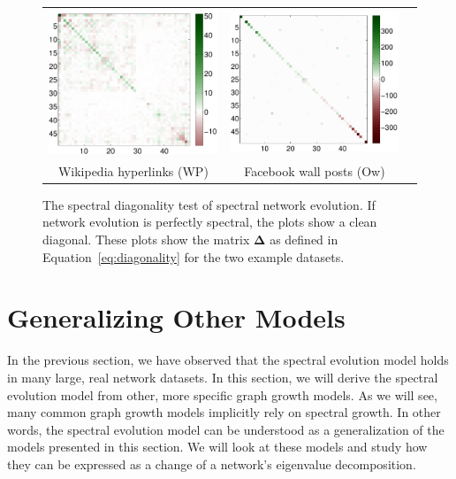 \documentclass[11pt,a4paper]{book}
\begin{document}
\begin{figure}[h!]
  \centering
  \begin{tabular}{ccc}
    \includegraphics[height=0.40\textwidth]{img-st/comp_permutation_map.symf.wikipedia-growth.a} &
    \includegraphics[height=0.40\textwidth]{img-st/comp_permutation_map.symf.facebook-wosn-wall.a} \\
    Wikipedia hyperlinks (\textsf{WP}) &
    Facebook wall posts (\textsf{Ow}) 
  \end{tabular}
  \caption{
    The spectral diagonality test of spectral network evolution.  If network
    evolution is perfectly spectral, the plots show a clean diagonal.
    These plots show the matrix $\mathbf \Delta$ as defined in
    Equation~\ref{eq:diagonality} for the two example datasets. 
  }
  \label{fig:diagonal}
\end{figure}

\section{Generalizing Other Models}
\label{sec:spectral-evolution-model:explanations}
In the previous section, we have observed that the spectral evolution model
holds in many large, real network datasets.  In this section, we will
derive the spectral evolution model from other, more specific graph
growth models. 
As we will see, 
many common graph growth models implicitly rely on spectral growth.  
In other words, the spectral evolution model can be understood as a
generalization of the models presented in this section. 
We will look at these models and study how they can be expressed as a
change of a network's eigenvalue decomposition. 
\end{document}
